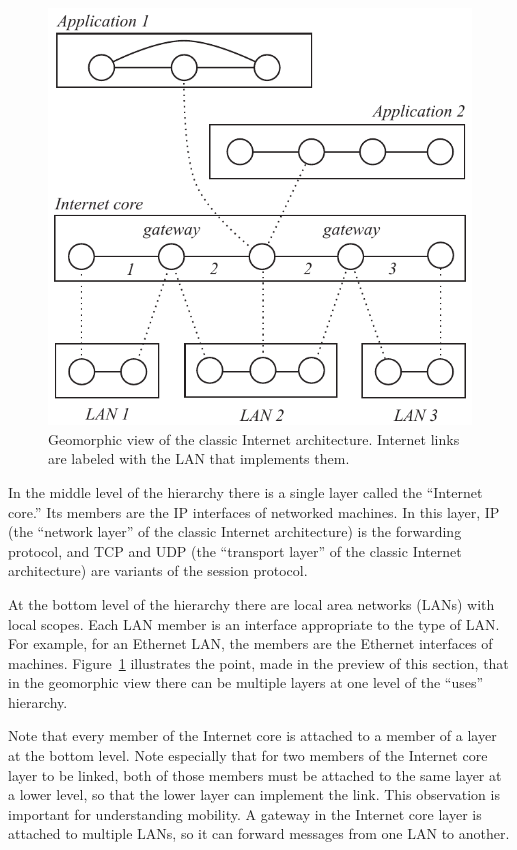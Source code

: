 \begin{figure}
\centering
\includegraphics[scale=0.80]{figures/newip.pdf}
\caption{Geomorphic view of the classic Internet architecture.
Internet links are labeled with the LAN that implements them.}
\label{fig:scope}
\end{figure}

In the middle level of the hierarchy there is a single layer called
the ``Internet core.''
Its members are the IP interfaces of networked machines.
In this layer, IP (the ``network layer'' of the classic Internet
architecture) is the forwarding protocol, and TCP and UDP
(the ``transport layer'' of the classic Internet architecture)
are variants of the session protocol.

At the bottom level of the hierarchy there are local area networks
(LANs) with local scopes.
Each LAN member is an interface appropriate to the type of LAN.
For example, for an Ethernet LAN, the members are the Ethernet interfaces
of machines.
Figure~\ref{fig:scope} illustrates the point, made in the preview
of this section, that in the geomorphic view there can be multiple layers
at one level of the ``uses'' hierarchy.

Note that every member of the Internet core is attached to a member
of a layer at the bottom level.
Note especially that for two members of the Internet core layer to
be linked, both of those members must be attached to the same layer
at a lower level, so that the lower layer can implement the link.
This observation is important for understanding mobility.
A gateway in the Internet core layer is attached to multiple LANs, 
so it can forward messages from one LAN to another.

